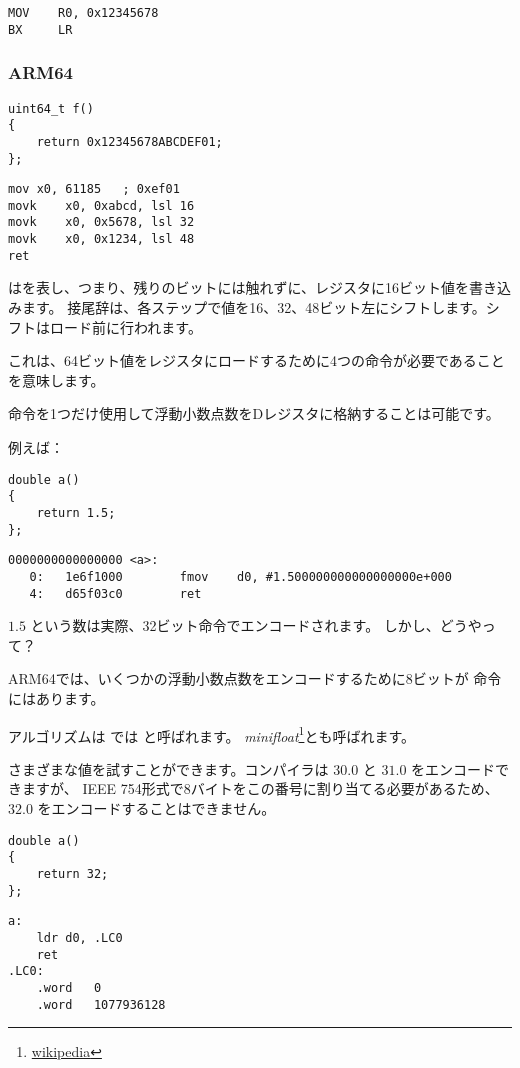 \begin{lstlisting}[style=customasmARM]
MOV    R0, 0x12345678
BX     LR
\end{lstlisting}

\subsubsection{ARM64}

\begin{lstlisting}[style=customc]
uint64_t f()
{
	return 0x12345678ABCDEF01;
};
\end{lstlisting}

\begin{lstlisting}[caption=GCC 4.9.1 -O3,style=customasmARM]
mov	x0, 61185   ; 0xef01
movk	x0, 0xabcd, lsl 16
movk	x0, 0x5678, lsl 32
movk	x0, 0x1234, lsl 48
ret
\end{lstlisting}

はを表し、つまり、残りのビットには触れずに、レジスタに16ビット値を書き込みます。
接尾辞は、各ステップで値を16、32、48ビット左にシフトします。シフトはロード前に行われます。

これは、64ビット値をレジスタにロードするために4つの命令が必要であることを意味します。


命令を1つだけ使用して浮動小数点数をDレジスタに格納することは可能です。

例えば：

\begin{lstlisting}[style=customc]
double a()
{
	return 1.5;
};
\end{lstlisting}

\begin{lstlisting}[caption=GCC 4.9.1 -O3 + objdump,style=customasmARM]
0000000000000000 <a>:
   0:   1e6f1000        fmov    d0, #1.500000000000000000e+000
   4:   d65f03c0        ret
\end{lstlisting}

$1.5$ という数は実際、32ビット命令でエンコードされます。
しかし、どうやって？

ARM64では、いくつかの浮動小数点数をエンコードするために8ビットが  命令にはあります。

アルゴリズムは \ARMSixFourRefURL では と呼ばれます。
\emph{minifloat}\footnote{\href{http://go.yurichev.com/17139}{wikipedia}}とも呼ばれます。

さまざまな値を試すことができます。コンパイラは $30.0$ と $31.0$ をエンコードできますが、
IEEE 754形式で8バイトをこの番号に割り当てる必要があるため、 $32.0$ をエンコードすることはできません。

\begin{lstlisting}[style=customc]
double a()
{
	return 32;
};
\end{lstlisting}

\begin{lstlisting}[caption=GCC 4.9.1 -O3,style=customasmARM]
a:
	ldr	d0, .LC0
	ret
.LC0:
	.word	0
	.word	1077936128
\end{lstlisting}
